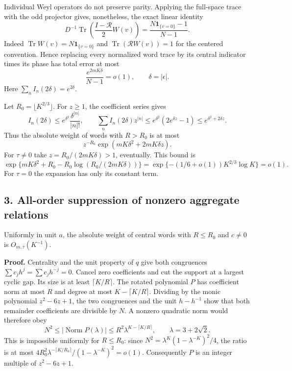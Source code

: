 Individual Weyl operators do not preserve parity. Applying the full-space
trace with the odd projector gives, nonetheless, the exact linear identity
\[
 D^{-1}\operatorname{Tr}\left(\frac{I-\mathcal R}{2}W(v)\right)
             =\frac{N\mathbf1_{\{v=0\}}-1}{N-1}.               \tag{R8}
\]
Indeed \(\operatorname{Tr}W(v)=N\mathbf1_{\{v=0\}}\) and
\(\operatorname{Tr}(\mathcal R W(v))=1\) for the centered convention.
Hence replacing every normalized word trace by its central indicator
times its phase has total error at most
\[
 \frac{e^{2mK\delta}}{N-1}=o(1),\qquad \delta=|\epsilon|.       \tag{R9}
\]
Here \(\sum_n I_n(2\delta)=e^{2\delta}\).

Let \(R_0=\lfloor K^{2/3}\rfloor\). For \(z\ge1\), the coefficient series gives
\[
 I_n(2\delta)\le e^{\delta^2}\frac{\delta^{|n|}}{|n|!},
 \qquad
 \sum_n I_n(2\delta)z^{|n|}
          \le e^{\delta^2}(2e^{\delta z}-1)
          \le e^{\delta^2+2\delta z}.
\]
Thus the absolute weight of words with \(R>R_0\) is at most
\[
 z^{-R_0}\exp(mK\delta^2+2mK\delta z).
\]
For \(\tau\ne0\) take \(z=R_0/(2mK\delta)>1\), eventually. This bound is
\[
 \exp\{mK\delta^2+R_0-R_0\log(R_0/(2mK\delta))\}
 =\exp\{-(1/6+o(1))K^{2/3}\log K\}=o(1).                      \tag{R10}
\]
For \(\tau=0\) the expansion has only its constant term.

\hypertarget{harmonic-returns-all-order-suppression-of-nonzero-aggregate-relations}{%
\subsection{3. All-order suppression of nonzero aggregate relations}\label{harmonic-returns-all-order-suppression-of-nonzero-aggregate-relations}}

\begin{lemma}\label{pass1:pell_harmonic_returns-2} Uniformly in unit \(a\), the absolute weight of central words
with \(R\le R_0\) and \(c\ne0\) is \(O_{m,\tau}(K^{-1})\).
\end{lemma}

\textbf{Proof.} Centrality and the unit property of \(q\) give both congruences
\(\sum c_jh^j=\sum c_jh^{-j}=0\). Cancel zero coefficients and cut the support
at a largest cyclic gap. Its size is at least \(\lceil K/R\rceil\).
The rotated polynomial \(P\) has coefficient norm at most \(R\) and degree
at most \(K-\lceil K/R\rceil\). Dividing by the monic polynomial
\(z^2-6z+1\), the two congruences and the unit \(h-h^{-1}\) show that both
remainder coefficients are divisible by \(N\). A nonzero quadratic norm
would therefore obey
\[
 N^2\le|\operatorname{Norm}P(\lambda)|
          \le R^2\lambda^{K-\lceil K/R\rceil},
                  \qquad \lambda=3+2\sqrt2.                   \tag{R11}
\]
This is impossible uniformly for \(R\le R_0\): since
\(N^2=\lambda^K(1-\lambda^{-K})^2/4\), the ratio is at most
\(4R_0^2\lambda^{-\lceil K/R_0\rceil}/(1-\lambda^{-K})^2=o(1)\).
Consequently \(P\) is an integer multiple of \(z^2-6z+1\).

